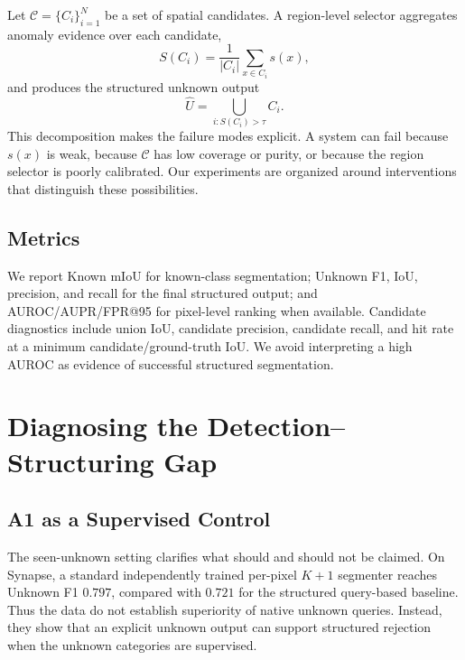\documentclass[journal]{IEEEtai}
\newcommand{\Cand}{\mathcal{C}}
\begin{document}
Let $\Cand=\{C_i\}_{i=1}^{N}$ be a set of spatial candidates. A region-level selector aggregates anomaly evidence over each candidate,
\begin{equation}
  S(C_i)=\frac{1}{|C_i|}\sum_{x\in C_i}s(x),
\end{equation}
and produces the structured unknown output
\begin{equation}
  \hat{U}=\bigcup_{i:S(C_i)>\tau} C_i.
\end{equation}
This decomposition makes the failure modes explicit. A system can fail because $s(x)$ is weak, because $\Cand$ has low coverage or purity, or because the region selector is poorly calibrated. Our experiments are organized around interventions that distinguish these possibilities.

\subsection{Metrics}
We report Known mIoU for known-class segmentation; Unknown F1, IoU, precision, and recall for the final structured output; and AUROC/AUPR/FPR@95 for pixel-level ranking when available. Candidate diagnostics include union IoU, candidate precision, candidate recall, and hit rate at a minimum candidate/ground-truth IoU. We avoid interpreting a high AUROC as evidence of successful structured segmentation.

\section{Diagnosing the Detection--Structuring Gap}
\label{sec:diagnosis}

\subsection{A1 as a Supervised Control}
The seen-unknown setting clarifies what should and should not be claimed. On Synapse, a standard independently trained per-pixel $K{+}1$ segmenter reaches Unknown F1 $0.797$, compared with $0.721$ for the structured query-based baseline. Thus the data do not establish superiority of native unknown queries. Instead, they show that an explicit unknown output can support structured rejection when the unknown categories are supervised.

\begin{table}[t]
\centering
\caption{Synapse seen-unknown control (single seed for independent architectures). A1 is treated as supervised $K{+}1$ segmentation rather than a claim of open-world discovery.}
\label{tab:a1_control}
\footnotesize
{}%
\end{table}
\end{document}
